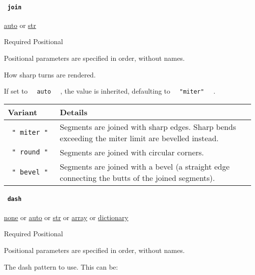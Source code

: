 \paragraph{\texorpdfstring{\texttt{\ join\ }}{ join }}\label{constructor-join}

\href{/docs/reference/foundations/auto/}{auto} {or}
\href{/docs/reference/foundations/str/}{str}

{Required} {{ Positional }}

\label{constructor-join-positional-tooltip}
Positional parameters are specified in order, without names.

How sharp turns are rendered.

If set to \texttt{\ }{\texttt{\ auto\ }}\texttt{\ } , the value is
inherited, defaulting to \texttt{\ }{\texttt{\ "miter"\ }}\texttt{\ } .

\begin{longtable}[]{@{}ll@{}}
\toprule\noalign{}
Variant & Details \\
\midrule\noalign{}
\endhead
\bottomrule\noalign{}
\endlastfoot
\texttt{\ "\ miter\ "\ } & Segments are joined with sharp edges. Sharp
bends exceeding the miter limit are bevelled instead. \\
\texttt{\ "\ round\ "\ } & Segments are joined with circular corners. \\
\texttt{\ "\ bevel\ "\ } & Segments are joined with a bevel (a straight
edge connecting the butts of the joined segments). \\
\end{longtable}

\paragraph{\texorpdfstring{\texttt{\ dash\ }}{ dash }}\label{constructor-dash}

\href{/docs/reference/foundations/none/}{none} {or}
\href{/docs/reference/foundations/auto/}{auto} {or}
\href{/docs/reference/foundations/str/}{str} {or}
\href{/docs/reference/foundations/array/}{array} {or}
\href{/docs/reference/foundations/dictionary/}{dictionary}

{Required} {{ Positional }}

\label{constructor-dash-positional-tooltip}
Positional parameters are specified in order, without names.

The dash pattern to use. This can be:

